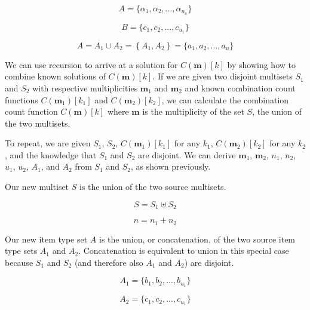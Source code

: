 \documentclass{article}
\begin{document}
\begin{equation}
    A = \{ \alpha_1, \alpha_2, ..., \alpha_{n_a}\}
\end{equation}

\begin{equation}
    B = \{ c_1, c_2, ..., c_{u_1}\}
\end{equation}

\begin{equation}
    A = A_1 \cup A_2 = \left\{ A_1, A_2 \right \} = \{ a_1, a_2, ..., a_{u} \}
\end{equation}



 
We can use recursion to arrive at a solution for $C(\bm{m})[k]$ by showing how to combine known solutions of $C(\bm{m})[k]$. If we are given two disjoint multisets $S_1$ and $S_2$ with respective multiplicities $\bm{m}_1$ and $\bm{m}_2$ and known combination count functions $C(\bm{m}_1)[k_1]$ and $C(\bm{m}_2)[k_2]$, we can calculate the combination count function $C(\bm{m})[k]$ where $\bm{m}$ is the multiplicity of the set $S$, the union of the two multisets.

To repeat, we are given $S_1$, $S_2$, $C(\bm{m}_1)[k_1]$ for any $k_1$, $C(\bm{m}_2)[k_2]$ for any $k_2$, and the knowledge that $S_1$ and $S_2$ are disjoint. We can derive $\bm{m}_1$, $\bm{m}_2$, $n_1$, $n_2$, $u_1$, $u_2$, $A_1$, and $A_2$ from $S_1$ and $S_2$, as shown previously.

Our new multiset $S$ is the union of the two source multisets.

\begin{equation}
    S = S_1 \uplus S_2
\end{equation}

\begin{equation}
    n = n_1 + n_2
\end{equation}

Our new item type set $A$ is the union, or concatenation, of the two source item type sets $A_1$ and $A_2$. Concatenation is equivalent to union in this special case because $S_1$ and $S_2$ (and therefore also $A_1$ and $A_2$) are disjoint.

\begin{equation}
    A_1 = \{ b_1, b_2, ..., b_{u_1}\}
\end{equation}

\begin{equation}
    A_2 = \{ c_1, c_2, ..., c_{u_1}\}
\end{equation}
\end{document}
